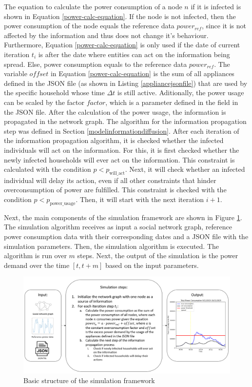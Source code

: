 The equation to calculate the power consumption 
of a node $n$ if it is infected is shown in Equation \ref{power-calc-equation}. 
If the node is not infected, then the power consumption of the node 
equals the reference data $power_{ref}$, since it is 
not affected by the information and thus does not change it's
behaviour. Furthermore, Equation \ref{power-calc-equation} 
is only used if the date of current iteration $t_i$
is after the date where entities can act 
on the information being spread. Else, power consumption
equals to the reference data $power_{ref}$.
The variable $offset$ in Equation \ref{power-calc-equation} 
is the sum of all appliances defined in the JSON file (as shown in Listing 
\ref{appliancejsonfile}) that are used by the 
specific household whose time $\Delta t$ is still active.
Aditionally, the power usage can be 
scaled by the factor $factor$, which is a parameter defined in 
the  field in the JSON file. 
After the calculation of the power usage, the information is 
propagated in the network graph. The algorithm 
for the information propagation step was defined in Section 
\ref{modelinformationdiffusion}.
After each iteration of the information propagation algorithm,
it is checked whether the infected individuals will act on 
the information. For this, it is first checked whether
the newly infected households will ever act on the information.
This constraint is calculated with the condition
$p<p_{\mathrm{will\_act}}$.
Next, it will check whether
an infected individual will delay its action, even if
all other constraints that hinder overconsumption of power
are fulfilled. This constraint is checked with the
condition $p<p_{\mathrm{power\_usage}}$. 
Then, it will start with the next iteration $i+1$.

Next, the main components of the simulation framework are shown
in Figure \ref{simframework}.
The simulation algorithm receives as input a social 
network graph, reference power consumption data with their 
corresponding dates and 
a JSON file with the simulation parameters. 
Then, the simulation algorithm is executed.
The algorithm is run over
$m$ steps. Next, the output of the simulation is the 
power demand over the time $[t, t+m]$ based on the
input parameters.

\begin{figure}[!ht]
    \center
    \includegraphics[scale=.66]{figs/Simulation-framework.png}
    \caption{Basic structure of the simulation framework}
    \label{simframework}
\end{figure}

